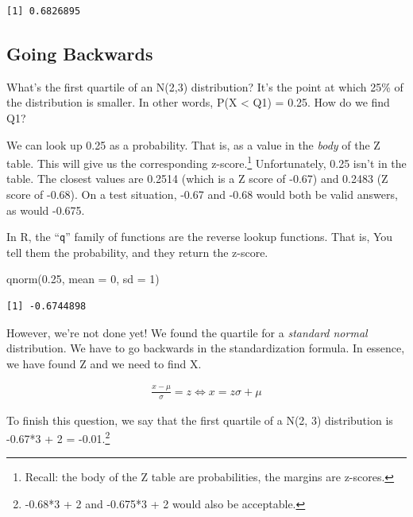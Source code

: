 \documentclass[
  letterpaper,
  DIV=11,
  numbers=noendperiod,
  oneside]{scrreprt}
\newenvironment{Shaded}{\begin{snugshade}}{\end{snugshade}}
\newcommand{\AttributeTok}[1]{\textcolor[rgb]{0.40,0.45,0.13}{#1}}
\newcommand{\DecValTok}[1]{\textcolor[rgb]{0.68,0.00,0.00}{#1}}
\newcommand{\FloatTok}[1]{\textcolor[rgb]{0.68,0.00,0.00}{#1}}
\newcommand{\FunctionTok}[1]{\textcolor[rgb]{0.28,0.35,0.67}{#1}}
\newcommand{\NormalTok}[1]{\textcolor[rgb]{0.00,0.23,0.31}{#1}}
\begin{document}
\begin{verbatim}
[1] 0.6826895
\end{verbatim}

\hypertarget{going-backwards}{%
\subsection{Going Backwards}\label{going-backwards}}

What's the first quartile of an N(2,3) distribution? It's the point at
which 25\% of the distribution is smaller. In other words, P(X
\textless{} Q1) = 0.25. How do we find Q1?

We can look up 0.25 as a probability. That is, as a value in the
\emph{body} of the Z table. This will give us the corresponding
z-score.\footnote{Recall: the body of the Z table are probabilities, the
  margins are z-scores.} Unfortunately, 0.25 isn't in the table. The
closest values are 0.2514 (which is a Z score of -0.67) and 0.2483 (Z
score of -0.68). On a test situation, -0.67 and -0.68 would both be
valid answers, as would -0.675.

In R, the ``\texttt{q}'' family of functions are the reverse lookup
functions. That is, You tell them the probability, and they return the
z-score.

\begin{Shaded}
\begin{Highlighting}[]
\FunctionTok{qnorm}\NormalTok{(}\FloatTok{0.25}\NormalTok{, }\AttributeTok{mean =} \DecValTok{0}\NormalTok{, }\AttributeTok{sd =} \DecValTok{1}\NormalTok{)}
\end{Highlighting}
\end{Shaded}

\begin{verbatim}
[1] -0.6744898
\end{verbatim}

However, we're not done yet! We found the quartile for a \emph{standard
normal} distribution. We have to go backwards in the standardization
formula. In essence, we have found Z and we need to find X.

\begin{align*}
\frac{x - \mu}{\sigma} = z \Leftrightarrow x = z\sigma + \mu
\end{align*}

To finish this question, we say that the first quartile of a N(2, 3)
distribution is -0.67*3 + 2 = -0.01.\footnote{-0.68*3 + 2 and -0.675*3 +
  2 would also be acceptable.}
\end{document}
